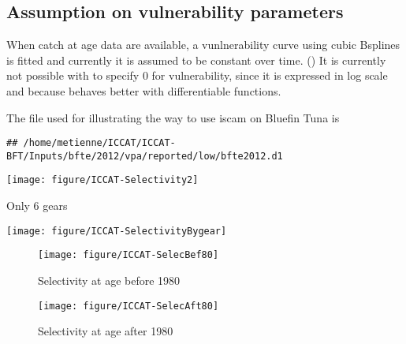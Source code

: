 \subsection{Assumption on vulnerability parameters}
When catch at age data are available, a vunlnerability curve using cubic Bsplines is fitted and currently it is assumed to be constant over time. ()
It is currently not possible with \iscam to specify 0 for vulnerability, since it is expressed in log scale and because \admb behaves better with differentiable functions.





The file used for illustrating the way to use iscam on Bluefin Tuna is
\begin{verbatim}
## /home/metienne/ICCAT/ICCAT-BFT/Inputs/bfte/2012/vpa/reported/low/bfte2012.d1
\end{verbatim}

{\centering \texttt{[image: figure/ICCAT-Selectivity2]} 

}

Only 6 gears


{\centering \texttt{[image: figure/ICCAT-SelectivityBygear]} 
}




\begin{figure}
{\centering \texttt{[image: figure/ICCAT-SelecBef80]} 

}

\caption[Selectivity at age before 1980]{Selectivity at age before 1980\label{fig:SelecBef80}}
\end{figure}


\begin{figure}
{\centering \texttt{[image: figure/ICCAT-SelecAft80]} 

}
\caption[Selectivity at age after 1980]{Selectivity at age after 1980\label{fig:SelecAft80}}
\end{figure}


